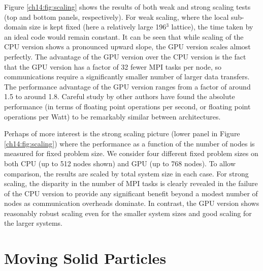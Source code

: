 Figure \ref{ch14:fig:scaling} shows the results of both weak and
strong scaling tests (top and bottom panels, respectively). For
weak scaling, where the local sub-domain size is kept fixed
(here a relatively large 196$^3$ lattice), the time taken by
an ideal code would remain constant. It can be seen that while
scaling of the CPU version shows a pronounced upward slope, the
GPU version scales almost perfectly. The advantage of the GPU
version over the CPU version is the fact that the GPU version
has a factor of 32 fewer MPI tasks per node, so communications
require a significantly smaller number of larger data transfers.
The performance
advantage of the GPU version ranges from a factor of around 1.5 to
around 1.8. Careful study by other authors \cite{williams2011} have
found the absolute performance (in terms of floating point
operations per second, or floating point operations per Watt) to
be remarkably similar between architectures.

Perhaps of more interest is the strong scaling picture (lower
panel in Figure \ref{ch14:fig:scaling}) where the performance
as a function of the number of nodes is measured for fixed problem
size. We consider four different fixed problem sizes on both CPU
(up to 512 nodes shown) and GPU (up to 768 nodes). To allow comparison,
the results are scaled by total system size in each case. For strong
scaling, the disparity in the number of MPI tasks is clearly revealed
in the failure of the CPU version to provide any significant benefit
beyond a modest number of nodes as communication overheads dominate.
In contrast, the GPU version shows
reasonably robust scaling even for the smaller system sizes and good
scaling for the larger systems.

\section{Moving Solid Particles}\label{ch14:sec:particles}  

